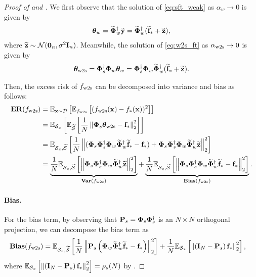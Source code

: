 \begin{proof}[Proof of  and ]
    We first observe that the solution of \eqref{eq:sft_weak} as $\alpha_w \to 0$ is given by
    \begin{align*}
        \thetab_w = \wt\Phib_w^\dagger \wt\yb = \wt\Phib_w^\dagger (\wt\fb_* + \wt\zb),
    \end{align*}
    where $\wt\zb \sim \Ncal(\b0_n, \sigma^2 \Ib_n)$.
    Meanwhile, the solution of \eqref{eq:w2s_ft} as $\alpha_\wts \to 0$ is given by
    \begin{align*}
        \thetab_\wts = \Phib_s^\dagger \Phib_w \thetab_w = \Phib_s^\dagger \Phib_w \wt\Phib_w^\dagger (\wt\fb_* + \wt\zb).
    \end{align*}  
    
    Then, the excess risk of $f_\wts$ can be decomposed into variance and bias as follows:
    \begin{align*}
        \exrisk(f_\wts) &= \E_{\xb \sim \Dcal}\sbr{\E_{f_\wts}\sbr{(f_\wts(\xb) - f_*(\xb))^2}} \\
        &= \E_{\Scal_x}\sbr{\E_{\wt\Scal}\sbr{\frac{1}{N}\nbr{\Phib_s \thetab_\wts - \fb_*}_2^2}} \\
        &=\E_{\Scal_x, \wt\Scal}\sbr{\frac{1}{N} \nbr{(\Phib_s \Phib_s^\dagger \Phib_w \wt\Phib_w^\dagger \wt\fb_* - \fb_*) + \Phib_s \Phib_s^\dagger \Phib_w \wt\Phib_w^\dagger \wt\zb}_2^2} \\
        &= \underbrace{\frac{1}{N} \E_{\Scal_x, \wt\Scal}\sbr{\nbr{\Phib_s \Phib_s^\dagger \Phib_w \wt\Phib_w^\dagger \wt\zb}_2^2}}_{\vari(f_\wts)} + \underbrace{\frac{1}{N} \E_{\Scal_x, \wt\Scal}\sbr{\nbr{\Phib_s \Phib_s^\dagger \Phib_w \wt\Phib_w^\dagger \wt\fb_* - \fb_*}_2^2}}_{\bias(f_\wts)}.
    \end{align*}

    \paragraph{Bias.}
    For the bias term, by observing that $\Pb_s = \Phib_s \Phib_s^\dagger$ is an $N \times N$ orthogonal projection, we can decompose the bias term as
    \begin{align*}
        \bias(f_\wts) &= \E_{\Scal_x, \wt\Scal}\sbr{\frac{1}{N} \nbr{\Pb_s \rbr{\Phib_w \wt\Phib_w^\dagger \wt\fb_* - \fb_*}}_2^2} + \frac{1}{N} \E_{\Scal_x}\sbr{\nbr{\rbr{\Ib_N - \Pb_s} \fb_*}_2^2},
    \end{align*}
    where $\E_{\Scal_x}\sbr{\nbr{\rbr{\Ib_N - \Pb_s} \fb_*}_2^2} = \rho_s(N)$ by .


\end{proof}
